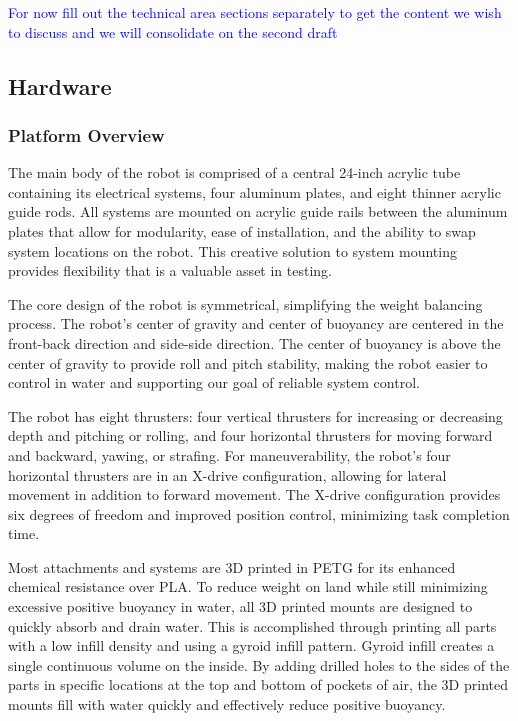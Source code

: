 \documentclass[conference]{IEEEtran}
\begin{document}
\textcolor{blue}{
For now fill out the technical area sections separately to get the content we wish to discuss and we will consolidate on the second draft
}

\subsection{Hardware}

\subsubsection{Platform Overview}
The main body of the robot is comprised of a central 24-inch acrylic tube containing its electrical systems, four aluminum plates, and eight thinner acrylic guide rods. All systems are mounted on acrylic guide rails between the aluminum plates that allow for modularity, ease of installation, and the ability to swap system locations on the robot. This creative solution to system mounting provides flexibility that is a valuable asset in testing.

The core design of the robot is symmetrical, simplifying the weight balancing process. The robot’s center of gravity and center of buoyancy are centered in the front-back direction and side-side direction. The center of buoyancy is above the center of gravity to provide roll and pitch stability, making the robot easier to control in water and supporting our goal of reliable system control. 

The robot has eight thrusters: four vertical thrusters for increasing or decreasing depth and pitching or rolling, and four horizontal thrusters for moving forward and backward, yawing, or strafing. For maneuverability, the robot’s four horizontal thrusters are in an X-drive configuration, allowing for lateral movement in addition to forward movement. The X-drive configuration provides six degrees of freedom and improved position control, minimizing task completion time. 

Most attachments and systems are 3D printed in PETG for its enhanced chemical resistance over PLA. To reduce weight on land while still minimizing excessive positive buoyancy in water, all 3D printed mounts are designed to quickly absorb and drain water. This is accomplished through printing all parts with a low infill density and using a gyroid infill pattern. Gyroid infill creates a single continuous volume on the inside. By adding drilled holes to the sides of the parts in specific locations at the top and bottom of pockets of air, the 3D printed mounts fill with water quickly and effectively reduce positive buoyancy. 
\end{document}
